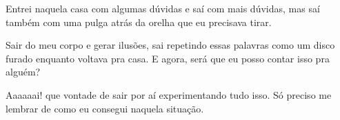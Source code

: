 Entrei naquela casa com algumas dúvidas e saí com mais dúvidas, mas saí também com uma pulga atrás da orelha que eu precisava tirar. 

Sair do meu corpo e gerar ilusões, sai repetindo essas palavras como um disco furado enquanto voltava pra casa. E agora, será que eu posso contar isso pra alguém?

Aaaaaai! que vontade de sair por aí experimentando tudo isso. Só preciso me lembrar de como eu consegui naquela situação.




